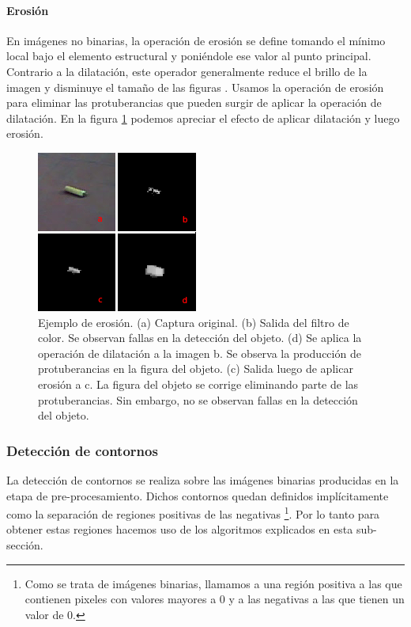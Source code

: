	\paragraph{Erosi\'on}
En im\'agenes no binarias, la operaci\'on de erosi\'on se define tomando el m\'inimo local bajo el elemento estructural y poni\'endole ese valor al punto principal. Contrario a la dilataci\'on, este operador generalmente reduce el brillo de la imagen y disminuye el tama\~no de las figuras \cite{nasa-dilate-erode}. Usamos la operaci\'on de erosi\'on para eliminar las protuberancias que pueden surgir de aplicar la operaci\'on de dilataci\'on. En la figura \ref{fig:erode} podemos apreciar el efecto de aplicar dilataci\'on y luego erosi\'on.

\begin{figure}[tpb]
\begin{center}
  \includegraphics[scale=0.8]{vision/figures/erosion.png}
\end{center}
  \caption[Ejemplo de erosi\'on]{\small Ejemplo de erosi\'on. (a) Captura original. (b) Salida del filtro de color. Se observan fallas en la detecci\'on del objeto. (d) Se aplica la operaci\'on de dilataci\'on a la imagen b. Se observa la producci\'on de protuberancias en la figura del objeto. (c) Salida luego de aplicar erosi\'on a c. La figura del objeto se corrige eliminando parte de las protuberancias. Sin embargo, no se observan fallas en la detecci\'on del objeto. }
  \label{fig:erode}
\end{figure}

	\subsubsection{Detecci\'on de contornos}
	La detecci\'on de contornos se realiza sobre las im\'agenes binarias producidas en la etapa de pre-procesamiento. Dichos contornos
	quedan definidos impl\'icitamente como la separaci\'on de regiones 
	positivas de las negativas \footnote{ Como se trata de im\'agenes 
	binarias, llamamos a una regi\'on positiva a las que contienen 
	pixeles con valores mayores a 0 y a las negativas a las que tienen 
	un valor de 0.}. Por lo tanto para obtener estas regiones hacemos 
	uso de los algoritmos explicados en esta sub-secci\'on.
	
